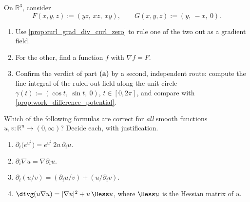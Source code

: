 \begin{aiexercise}
\label{ex:ai_which_fields_are_gradients}
On $\mathbb{R}^3$, consider
\[F(x,y,z) := (yz,\ xz,\ xy), \qquad G(x,y,z) := (y,\ -x,\ 0).\]
\begin{enumerate}[label=\textbf{(\alph*)}]
  \item Use \cref{prop:curl_grad_div_curl_zero} to rule one of the two out as a gradient field.
  \item For the other, find a function $f$ with $\nabla f = F$.
  \item Confirm the verdict of part \textbf{(a)} by a second, independent route: compute the
    line integral of the ruled-out field along the unit circle
    $\gamma(t) := (\cos t,\ \sin t,\ 0)$, $t \in [0,2\pi]$, and compare with
    \cref{prop:work_difference_potential}.
\end{enumerate}
\end{aiexercise}

\begin{exercise}
\label{ex:differential_identities_true_false}
Which of the following formulas are correct for \emph{all} smooth functions
$u,v : \mathbb{R}^n \to (0,\infty)$? Decide each, with justification.
\begin{enumerate}[label=\textbf{(\alph*)}]
  \item $\partial_i\big(e^{u^2}\big) = e^{u^2}\,2u\,\partial_i u$.
  \item $\partial_i \nabla u = \nabla \partial_i u$.
  \item $\partial_i(u/v) = (\partial_i u / v) + (u / \partial_i v)$.
  \item $\divg(u\nabla u) = \lvert\nabla u\rvert^2 + u\,\Hess u$, where $\Hess u$ is the Hessian
    matrix of $u$.
\end{enumerate}
\end{exercise}

